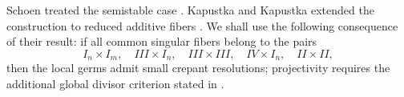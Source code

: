\documentclass[a4paper]{amsart}
\theoremstyle{plain}
\newtheorem{Pro}[Thm]{Proposition}
\theoremstyle{definition}
\theoremstyle{remark}
\numberwithin{equation}{section}
\begin{document}
Schoen treated the semistable case \cite{Schoen}.  Kapustka and Kapustka
extended the construction to reduced additive fibers \cite[Propositions
1.1--1.2]{KK}.  We shall use the following consequence of their result: if
all common singular fibers belong to the pairs
\[
I_n\times I_m,\quad III\times I_n,\quad III\times III,
\quad IV\times I_n,\quad II\times II,
\]
then the local germs admit small crepant resolutions; projectivity requires
the additional global divisor criterion stated in \cite[Proposition~1.2]{KK}.


%
\end{document}
